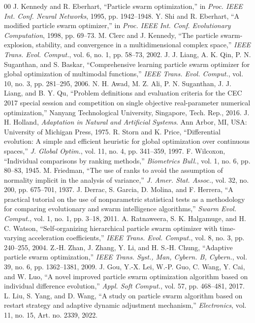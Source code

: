 \documentclass[conference]{IEEEtran}
\begin{document}
\begingroup
\scriptsize
\begin{thebibliography}{00}
 J. Kennedy and R. Eberhart, ``Particle swarm optimization,'' in \textit{Proc. IEEE Int. Conf. Neural Networks}, 1995, pp. 1942--1948.
 Y. Shi and R. Eberhart, ``A modified particle swarm optimizer,'' in \textit{Proc. IEEE Int. Conf. Evolutionary Computation}, 1998, pp. 69--73.
 M. Clerc and J. Kennedy, ``The particle swarm-explosion, stability, and convergence in a multidimensional complex space,'' \textit{IEEE Trans. Evol. Comput.}, vol. 6, no. 1, pp. 58--73, 2002.
 J. J. Liang, A. K. Qin, P. N. Suganthan, and S. Baskar, ``Comprehensive learning particle swarm optimizer for global optimization of multimodal functions,'' \textit{IEEE Trans. Evol. Comput.}, vol. 10, no. 3, pp. 281--295, 2006.
 N. H. Awad, M. Z. Ali, P. N. Suganthan, J. J. Liang, and B. Y. Qu, ``Problem definitions and evaluation criteria for the CEC 2017 special session and competition on single objective real-parameter numerical optimization,'' Nanyang Technological University, Singapore, Tech. Rep., 2016.
 J. H. Holland, \textit{Adaptation in Natural and Artificial Systems}. Ann Arbor, MI, USA: University of Michigan Press, 1975.
 R. Storn and K. Price, ``Differential evolution: A simple and efficient heuristic for global optimization over continuous spaces,'' \textit{J. Global Optim.}, vol. 11, no. 4, pp. 341--359, 1997.
 F. Wilcoxon, ``Individual comparisons by ranking methods,'' \textit{Biometrics Bull.}, vol. 1, no. 6, pp. 80--83, 1945.
 M. Friedman, ``The use of ranks to avoid the assumption of normality implicit in the analysis of variance,'' \textit{J. Amer. Stat. Assoc.}, vol. 32, no. 200, pp. 675--701, 1937.
 J. Derrac, S. Garcia, D. Molina, and F. Herrera, ``A practical tutorial on the use of nonparametric statistical tests as a methodology for comparing evolutionary and swarm intelligence algorithms,'' \textit{Swarm Evol. Comput.}, vol. 1, no. 1, pp. 3--18, 2011.
     A. Ratnaweera, S. K. Halgamuge, and H. C. Watson, ``Self-organizing hierarchical particle swarm optimizer with time-varying acceleration coefficients,'' \textit{IEEE Trans. Evol. Comput.}, vol. 8, no. 3, pp. 240--255, 2004.
     Z.-H. Zhan, J. Zhang, Y. Li, and H. S.-H. Chung, ``Adaptive particle swarm optimization,'' \textit{IEEE Trans. Syst., Man, Cybern. B, Cybern.}, vol. 39, no. 6, pp. 1362--1381, 2009.
     J. Gou, Y.-X. Lei, W.-P. Guo, C. Wang, Y. Cai, and W. Luo, ``A novel improved particle swarm optimization algorithm based on individual difference evolution,'' \textit{Appl. Soft Comput.}, vol. 57, pp. 468--481, 2017.
     L. Liu, S. Yang, and D. Wang, ``A study on particle swarm algorithm based on restart strategy and adaptive dynamic adjustment mechanism,'' \textit{Electronics}, vol. 11, no. 15, Art. no. 2339, 2022.
\end{thebibliography}
\endgroup
\end{document}
